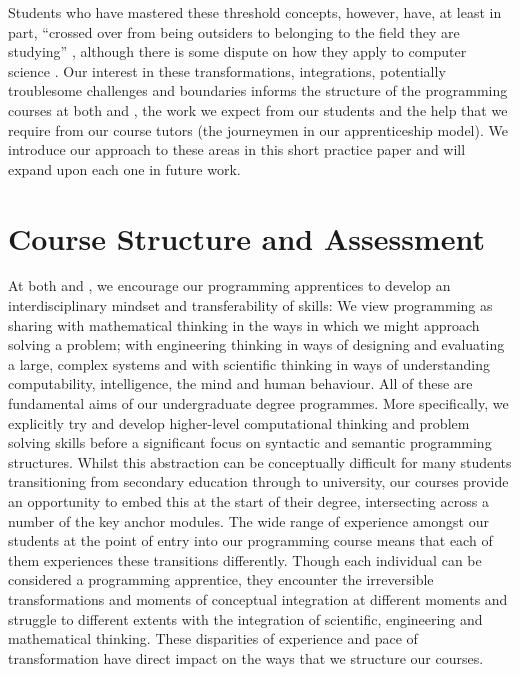 \documentclass[conference,compsoc]{IEEEtran}
\begin{document}
Students who have mastered these threshold concepts, however, have, at least in part, ``crossed over from being outsiders to belonging to the field they are studying'' \cite{Eckerdal}, although there is some dispute on how they apply to computer science \cite{Boustedt}.
 Our interest in these transformations, integrations, potentially troublesome challenges and boundaries informs the structure of the programming courses at both \Bath{} and \Cardiff, the work we expect from our students and the help that we require from our course tutors (the journeymen in our apprenticeship model). We introduce our approach to these areas in this short practice paper and will expand upon each one in future work.

\section{Course Structure and Assessment}
At both \Bath{} and \Cardiff{}, we encourage our programming apprentices to develop an interdisciplinary mindset and transferability of skills: We view programming as sharing with mathematical thinking in the ways in which we might approach solving a problem; with engineering thinking in ways of designing and evaluating a large, complex systems and with scientific thinking in ways of understanding computability, intelligence, the mind and human behaviour. All of these are fundamental aims of our undergraduate degree programmes.
 More specifically, we explicitly try and develop higher-level computational thinking and problem solving skills before a significant focus on syntactic and semantic programming structures. Whilst this abstraction can be conceptually difficult for many students transitioning from secondary education through to university, our courses provide an opportunity to embed this at the start of their degree, intersecting across a number of the key anchor modules.
 The wide range of experience amongst our students at the point of entry into our programming course means that each of them experiences these transitions differently. Though each individual can be considered a programming apprentice, they encounter the irreversible transformations and moments of conceptual integration at different moments and struggle to different extents with the integration of scientific, engineering and mathematical thinking.
These disparities of experience and pace of transformation have direct impact on the ways that we structure our courses.
\end{document}
